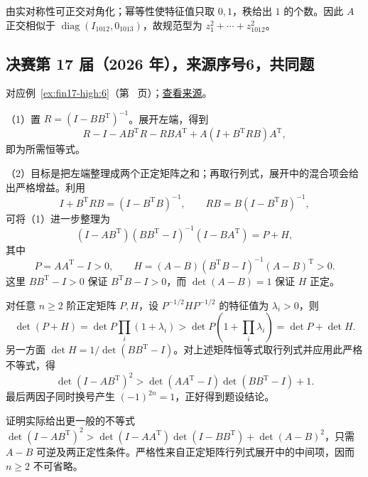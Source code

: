 \documentclass[UTF8,12pt,a4paper,fontset=fandol]{ctexart}
\begin{document}
\begin{solve}

由实对称性可正交对角化；幂等性使特征值只取 $0,1$，秩给出 $1$ 的个数。因此 $A$ 正交相似于 $\operatorname{diag}(I_{1012},0_{1013})$，故规范型为 $\boxed{z_1^2+\cdots+z_{1012}^2}$。

\end{solve}

\subsection{决赛第 17 届（2026 年），来源序号6，共同题}\label{ans:fin17-high:6}\label{pr:fin17-high:6}

对应例~\ref{ex:fin17-high:6}（第~\pageref{ex:fin17-high:6} 页）；\href{https://github.com/lzxcr/cmc-mathematics/blob/64916fa1fdbc3e444a652eca204d5669058ee321/src/problems/finals/17/06.md}{查看来源}。

\begin{solve}

（1）置 $R=(I-BB^{\mathrm T})^{-1}$。展开左端，得到
\[
R-I-AB^{\mathrm T}R-RBA^{\mathrm T}
+A(I+B^{\mathrm T}RB)A^{\mathrm T},
\]
即为所需恒等式。

（2）目标是把左端整理成两个正定矩阵之和；再取行列式，展开中的混合项会给出严格增益。利用
\[
I+B^{\mathrm T}RB=(I-B^{\mathrm T}B)^{-1},\qquad
RB=B(I-B^{\mathrm T}B)^{-1},
\]
可将（1）进一步整理为
\[
(I-AB^{\mathrm T})(BB^{\mathrm T}-I)^{-1}(I-BA^{\mathrm T})=P+H,
\]
其中
\[
P=AA^{\mathrm T}-I>0,\qquad
H=(A-B)(B^{\mathrm T}B-I)^{-1}(A-B)^{\mathrm T}>0.
\]
这里 $BB^{\mathrm T}-I>0$ 保证 $B^{\mathrm T}B-I>0$，而 $\det(A-B)=1$ 保证 $H$ 正定。

对任意 $n\ge2$ 阶正定矩阵 $P,H$，设 $P^{-1/2}HP^{-1/2}$ 的特征值为 $\lambda_i>0$，则
\[
\det(P+H)=\det P\prod_i(1+\lambda_i)
>\det P\left(1+\prod_i\lambda_i\right)=\det P+\det H.
\]
另一方面 $\det H=1/\det(BB^{\mathrm T}-I)$。对上述矩阵恒等式取行列式并应用此严格不等式，得
\[
\det(I-AB^{\mathrm T})^2>
\det(AA^{\mathrm T}-I)\det(BB^{\mathrm T}-I)+1.
\]
最后两因子同时换号产生 $(-1)^{2n}=1$，正好得到题设结论。

\end{solve}

\begin{remark}[方法与条件]

证明实际给出更一般的不等式
$\det(I-AB^{\mathrm T})^2>\det(I-AA^{\mathrm T})\det(I-BB^{\mathrm T})+\det(A-B)^2$，只需 $A-B$ 可逆及两正定性条件。严格性来自正定矩阵行列式展开中的中间项，因而 $n\ge2$ 不可省略。

\end{remark}
\end{document}
